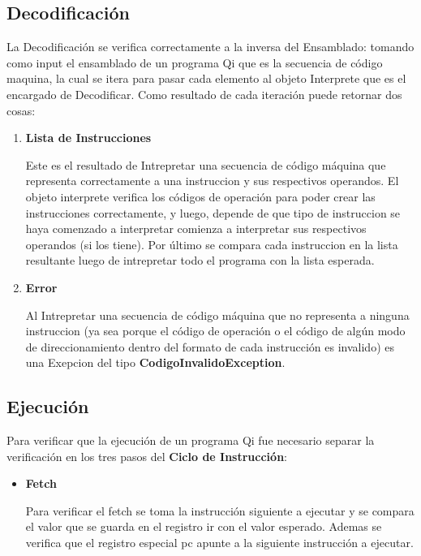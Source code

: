 \begin{enumerate}
\subsection{Decodificación}

La Decodificación se verifica correctamente a la inversa del Ensamblado: tomando como input el ensamblado de un programa Qi que es la secuencia de código maquina, la cual se itera para pasar cada elemento al objeto Interprete que es el encargado de Decodificar. Como resultado de cada iteración puede retornar dos cosas:
 
\begin{enumerate}
\item \textbf{Lista de Instrucciones} 

Este es el resultado de Intrepretar una secuencia de código máquina que representa correctamente a una instruccion y sus respectivos operandos. El objeto interprete verifica los códigos de operación para poder crear las instrucciones correctamente, y luego, depende de que tipo de instruccion se haya comenzado a interpretar comienza a interpretar sus respectivos operandos (si los tiene).
Por último se compara cada instruccion en la lista resultante luego de intrepretar todo el programa con la lista esperada.

\item\textbf{Error}

Al Intrepretar una secuencia de código máquina que no representa a ninguna instruccion (ya sea porque el código de operación o el código de algún modo de direccionamiento dentro del formato de cada instrucción es invalido) es una Exepcion del tipo \textbf{CodigoInvalidoException}.   
\end{enumerate}

\subsection{Ejecución}

Para verificar que la ejecución de un programa Qi fue necesario separar la verificación en los tres pasos del \textbf{Ciclo de Instrucción}:

\begin{itemize}
\item \textbf{Fetch} 

Para verificar el fetch se toma la instrucción siguiente a ejecutar y se compara el valor que se guarda en el registro ir con el valor esperado. Ademas se verifica que el registro especial pc apunte a la siguiente instrucción a ejecutar.


\end{itemize}
\end{enumerate}
